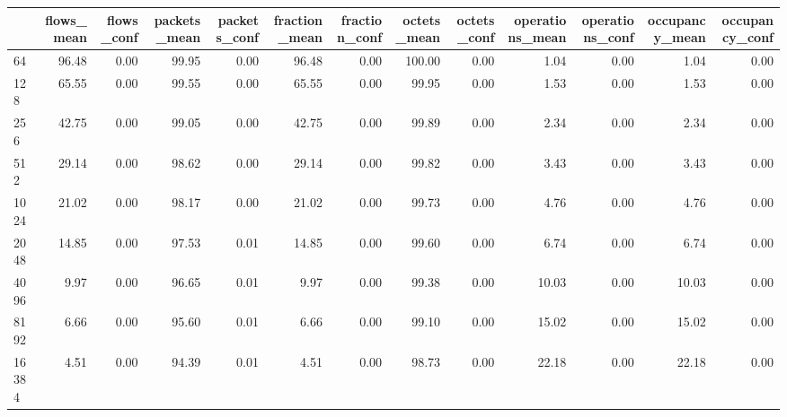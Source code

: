 \begin{tabular}{lrrrrrrrrrrrr}
\toprule
{} &  flows\_mean &  flows\_conf &  packets\_mean &  packets\_conf &  fraction\_mean &  fraction\_conf &  octets\_mean &  octets\_conf &  operations\_mean &  operations\_conf &  occupancy\_mean &  occupancy\_conf \\
\midrule
64         &       96.48 &        0.00 &         99.95 &          0.00 &          96.48 &           0.00 &       100.00 &         0.00 &             1.04 &             0.00 &            1.04 &            0.00 \\
128        &       65.55 &        0.00 &         99.55 &          0.00 &          65.55 &           0.00 &        99.95 &         0.00 &             1.53 &             0.00 &            1.53 &            0.00 \\
256        &       42.75 &        0.00 &         99.05 &          0.00 &          42.75 &           0.00 &        99.89 &         0.00 &             2.34 &             0.00 &            2.34 &            0.00 \\
512        &       29.14 &        0.00 &         98.62 &          0.00 &          29.14 &           0.00 &        99.82 &         0.00 &             3.43 &             0.00 &            3.43 &            0.00 \\
1024       &       21.02 &        0.00 &         98.17 &          0.00 &          21.02 &           0.00 &        99.73 &         0.00 &             4.76 &             0.00 &            4.76 &            0.00 \\
2048       &       14.85 &        0.00 &         97.53 &          0.01 &          14.85 &           0.00 &        99.60 &         0.00 &             6.74 &             0.00 &            6.74 &            0.00 \\
4096       &        9.97 &        0.00 &         96.65 &          0.01 &           9.97 &           0.00 &        99.38 &         0.00 &            10.03 &             0.00 &           10.03 &            0.00 \\
8192       &        6.66 &        0.00 &         95.60 &          0.01 &           6.66 &           0.00 &        99.10 &         0.00 &            15.02 &             0.00 &           15.02 &            0.00 \\
16384      &        4.51 &        0.00 &         94.39 &          0.01 &           4.51 &           0.00 &        98.73 &         0.00 &            22.18 &             0.00 &           22.18 &            0.00 \\

\end{tabular}
